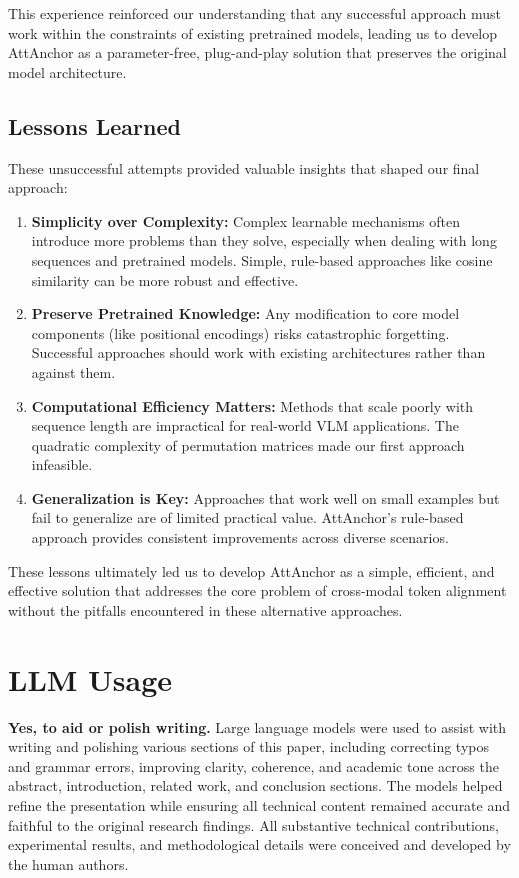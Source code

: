 \documentclass[11pt]{article}
\begin{document}
This experience reinforced our understanding that any successful approach must work within the constraints of existing pretrained models, leading us to develop AttAnchor as a parameter-free, plug-and-play solution that preserves the original model architecture.

\subsection{Lessons Learned}

These unsuccessful attempts provided valuable insights that shaped our final approach:

\begin{enumerate}
\item \textbf{Simplicity over Complexity:} Complex learnable mechanisms often introduce more problems than they solve, especially when dealing with long sequences and pretrained models. Simple, rule-based approaches like cosine similarity can be more robust and effective.

\item \textbf{Preserve Pretrained Knowledge:} Any modification to core model components (like positional encodings) risks catastrophic forgetting. Successful approaches should work with existing architectures rather than against them.

\item \textbf{Computational Efficiency Matters:} Methods that scale poorly with sequence length are impractical for real-world VLM applications. The quadratic complexity of permutation matrices made our first approach infeasible.

\item \textbf{Generalization is Key:} Approaches that work well on small examples but fail to generalize are of limited practical value. AttAnchor's rule-based approach provides consistent improvements across diverse scenarios.
\end{enumerate}

These lessons ultimately led us to develop AttAnchor as a simple, efficient, and effective solution that addresses the core problem of cross-modal token alignment without the pitfalls encountered in these alternative approaches.

\section{LLM Usage}
\label{app:llm_usage}

\textbf{Yes, to aid or polish writing.} Large language models were used to assist with writing and polishing various sections of this paper, including correcting typos and grammar errors, improving clarity, coherence, and academic tone across the abstract, introduction, related work, and conclusion sections. The models helped refine the presentation while ensuring all technical content remained accurate and faithful to the original research findings. All substantive technical contributions, experimental results, and methodological details were conceived and developed by the human authors.
\end{document}

